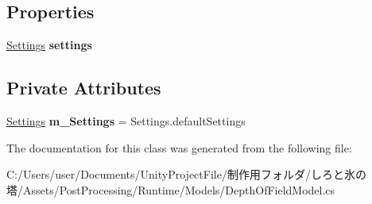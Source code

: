 \subsection*{Properties}
\begin{DoxyCompactItemize}
\item 
\mbox{\label{class_unity_engine_1_1_post_processing_1_1_depth_of_field_model_aa547c7750456651d57d3d4c2bfb91409}} 
\hyperlink{struct_unity_engine_1_1_post_processing_1_1_depth_of_field_model_1_1_settings}{Settings} {\bfseries settings}
\end{DoxyCompactItemize}
\subsection*{Private Attributes}
\begin{DoxyCompactItemize}
\item 
\mbox{\label{class_unity_engine_1_1_post_processing_1_1_depth_of_field_model_a273f44ecbe0a9ee8bbce7e7d3e2d84ff}} 
\hyperlink{struct_unity_engine_1_1_post_processing_1_1_depth_of_field_model_1_1_settings}{Settings} {\bfseries m\+\_\+\+Settings} = Settings.\+default\+Settings
\end{DoxyCompactItemize}


The documentation for this class was generated from the following file\+:\begin{DoxyCompactItemize}
\item 
C\+:/\+Users/user/\+Documents/\+Unity\+Project\+File/制作用フォルダ/しろと氷の塔/\+Assets/\+Post\+Processing/\+Runtime/\+Models/Depth\+Of\+Field\+Model.\+cs\end{DoxyCompactItemize}
